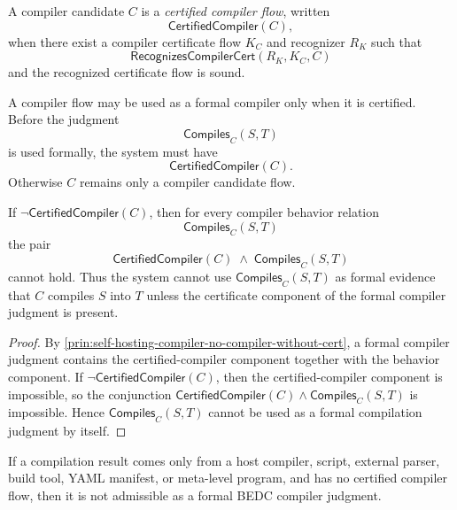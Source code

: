 \begin{definition}
\label{def:self-hosting-compiler-certified-compiler}
A compiler candidate $C$ is a \emph{certified compiler flow}, written
$$
  \mathsf{CertifiedCompiler}(C),
$$
when there exist a compiler certificate flow $K_C$ and recognizer $R_K$ such that
$$
  \mathsf{RecognizesCompilerCert}(R_K,K_C,C)
$$
and the recognized certificate flow is sound.
\end{definition}

\begin{principle}
\label{prin:self-hosting-compiler-no-compiler-without-cert}
A compiler flow may be used as a formal compiler only when it is certified. Before the judgment
$$
  \mathsf{Compiles}_C(S,T)
$$
is used formally, the system must have
$$
  \mathsf{CertifiedCompiler}(C).
$$
Otherwise $C$ remains only a compiler candidate flow.
\end{principle}

\begin{theorem}
\label{thm:self-hosting-compiler-uncertified-cannot-compile}
If $\neg\mathsf{CertifiedCompiler}(C)$, then for every compiler behavior relation
$$
  \mathsf{Compiles}_C(S,T)
$$
the pair
$$
  \mathsf{CertifiedCompiler}(C)
  \;\wedge\;
  \mathsf{Compiles}_C(S,T)
$$
cannot hold. Thus the system cannot use $\mathsf{Compiles}_C(S,T)$ as formal evidence that $C$ compiles $S$ into $T$ unless the certificate component of the formal compiler judgment is present.
\end{theorem}

\begin{proof}
By \autoref{prin:self-hosting-compiler-no-compiler-without-cert}, a formal compiler judgment contains the certified-compiler component together with the behavior component. If $\neg\mathsf{CertifiedCompiler}(C)$, then the certified-compiler component is impossible, so the conjunction $\mathsf{CertifiedCompiler}(C)\wedge\mathsf{Compiles}_C(S,T)$ is impossible. Hence $\mathsf{Compiles}_C(S,T)$ cannot be used as a formal compilation judgment by itself.
\end{proof}

\begin{corollary}
\label{cor:self-hosting-compiler-host-output-inadmissible}
If a compilation result comes only from a host compiler, script, external parser, build tool, YAML manifest, or meta-level program, and has no certified compiler flow, then it is not admissible as a formal BEDC compiler judgment.
\end{corollary}

